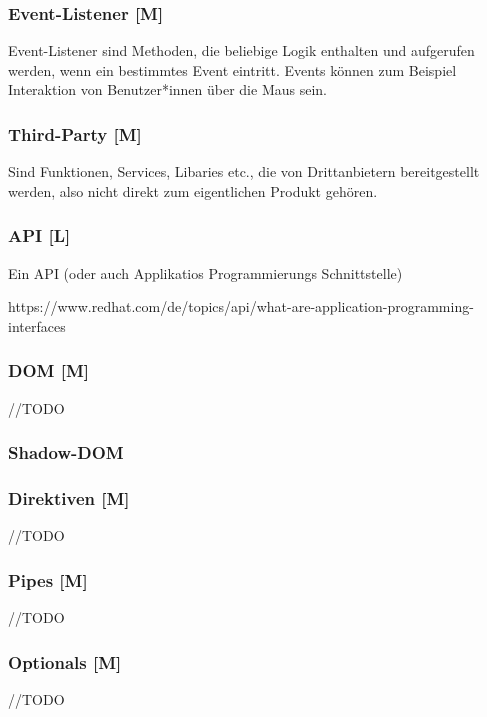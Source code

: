 \subsubsection{Event-Listener [M]}
\label{txt:glos:event-listener}
Event-Listener sind Methoden, die beliebige Logik enthalten und aufgerufen werden, wenn ein bestimmtes Event eintritt. Events können zum Beispiel Interaktion von Benutzer*innen über die Maus sein. 

\subsubsection{Third-Party [M]}
Sind Funktionen, Services, Libaries etc., die von Drittanbietern bereitgestellt werden, also nicht direkt zum eigentlichen Produkt gehören. 

\subsubsection{API [L]}
\label{txt:glos:API}
Ein API (oder auch Applikatios Programmierungs Schnittstelle)

https://www.redhat.com/de/topics/api/what-are-application-programming-interfaces

\subsubsection{DOM [M]}
\label{txt:glos:DOM}
//TODO 
\subsubsection{Shadow-DOM}


\subsubsection{Direktiven [M]}
//TODO

\subsubsection{Pipes [M]}
//TODO

\subsubsection{Optionals [M]}
//TODO